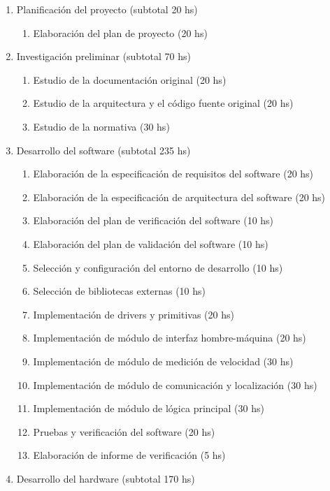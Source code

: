 \documentclass[11pt]{charter}
\begin{document}
\begin{enumerate}
\item Planificación del proyecto \hfill (subtotal 20 hs)
  \begin{enumerate}
  \item Elaboración del plan de proyecto \hfill (20 hs)
  \end{enumerate}
\item Investigación preliminar \hfill (subtotal 70 hs)
  \begin{enumerate}
  \item Estudio de la documentación original \hfill (20 hs)
  \item Estudio de la arquitectura y el código fuente original \hfill (20 hs)
  \item Estudio de la normativa \hfill (30 hs)
  \end{enumerate}
\item Desarrollo del software \hfill (subtotal 235 hs)
  \begin{enumerate}
  \item Elaboración de la especificación de requisitos del software \hfill (20 hs)
  \item Elaboración de la especificación de arquitectura del software \hfill (20 hs)
  \item Elaboración del plan de verificación del software \hfill (10 hs)
  \item Elaboración del plan de validación del software \hfill (10 hs)
  \item Selección y configuración del entorno de desarrollo \hfill (10 hs)
  \item Selección de bibliotecas externas \hfill (10 hs)
  \item Implementación de drivers y primitivas \hfill (20 hs)
  \item Implementación de módulo de interfaz hombre-máquina \hfill (20 hs)
  \item Implementación de módulo de medición de velocidad \hfill (30 hs)
  \item Implementación de módulo de comunicación y localización \hfill (30 hs)
  \item Implementación de módulo de lógica principal \hfill (30 hs)
  \item Pruebas y verificación del software \hfill (20 hs)
  \item Elaboración de informe de verificación \hfill (5 hs)
  \end{enumerate}
\item Desarrollo del hardware \hfill (subtotal 170 hs)

\end{enumerate}
\end{document}
